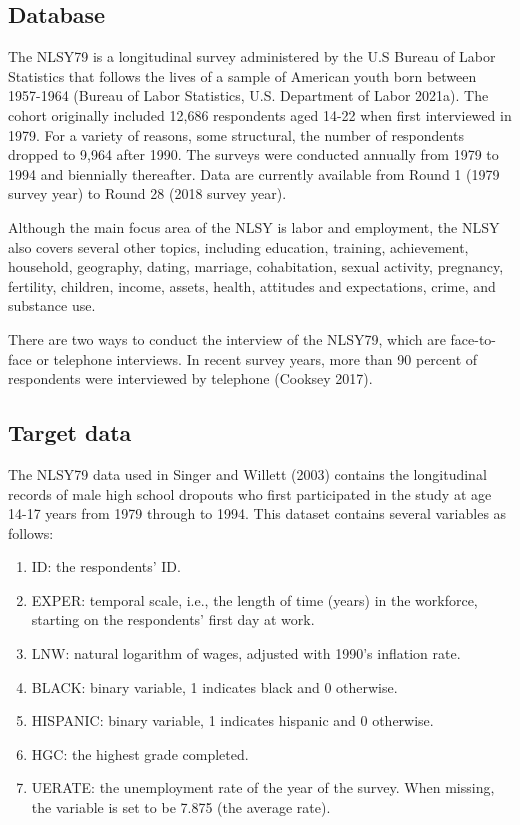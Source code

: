 \documentclass[12pt]{article}
\providecommand{\tightlist}{%
  \setlength{\itemsep}{0pt}\setlength{\parskip}{0pt}}
\begin{document}
\hypertarget{database-1}{%
\subsection{Database}\label{database-1}}

The NLSY79 is a longitudinal survey administered by the U.S Bureau of Labor Statistics that follows the lives of a sample of American youth born between 1957-1964 (Bureau of Labor Statistics, U.S. Department of Labor 2021a). The cohort originally included 12,686 respondents aged 14-22 when first interviewed in 1979. For a variety of reasons, some structural, the number of respondents dropped to 9,964 after 1990. The surveys were conducted annually from 1979 to 1994 and biennially thereafter. Data are currently available from Round 1 (1979 survey year) to Round 28 (2018 survey year).

Although the main focus area of the NLSY is labor and employment, the NLSY also covers several other topics, including education, training, achievement, household, geography, dating, marriage, cohabitation, sexual activity, pregnancy, fertility, children, income, assets, health, attitudes and expectations, crime, and substance use.

There are two ways to conduct the interview of the NLSY79, which are face-to-face or telephone interviews. In recent survey years, more than 90 percent of respondents were interviewed by telephone (Cooksey 2017).

\hypertarget{target}{%
\subsection{Target data}\label{target}}

The NLSY79 data used in Singer and Willett (2003) contains the longitudinal records of male high school dropouts who first participated in the study at age 14-17 years from 1979 through to 1994. This dataset contains several variables as follows:

\begin{enumerate}
\def\labelenumi{\arabic{enumi}.}
\tightlist
\item
  ID: the respondents' ID.
\item
  EXPER: temporal scale, i.e., the length of time (years) in the workforce, starting on the respondents' first day at work.
\item
  LNW: natural logarithm of wages, adjusted with 1990's inflation rate.
\item
  BLACK: binary variable, 1 indicates black and 0 otherwise.
\item
  HISPANIC: binary variable, 1 indicates hispanic and 0 otherwise.
\item
  HGC: the highest grade completed.
\item
  UERATE: the unemployment rate of the year of the survey. When missing, the variable is set to be 7.875 (the average rate).
\end{enumerate}
\end{document}
